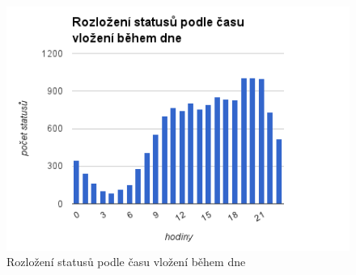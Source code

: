 \documentclass[thesis=M,czech]{FITthesis}[2013/05/10]
\begin{document}
\begin{figure}[h]
\includegraphics[width=5in]{figures/postedHours.png}
\caption{Rozložení statusů podle času vložení během dne}
\label{fig:postedHours}
\end{figure}
\end{document}
